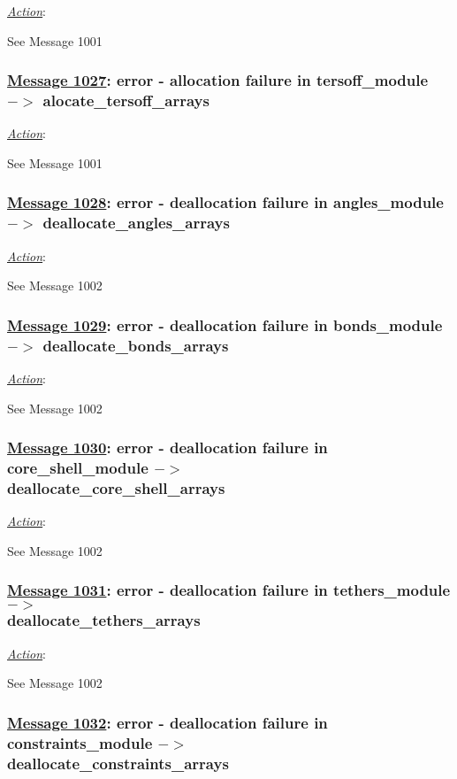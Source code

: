 \noindent \underline{\em Action}:

See Message 1001

\subsubsection*{\underline{Message 1027}: error - allocation failure in tersoff\_module $->$ alocate\_tersoff\_arrays}

\noindent \underline{\em Action}:

See Message 1001

\subsubsection*{\underline{Message 1028}: error - deallocation failure in angles\_module $->$ deallocate\_angles\_arrays}

\noindent \underline{\em Action}:

See Message 1002

\subsubsection*{\underline{Message 1029}: error - deallocation failure in bonds\_module $->$ deallocate\_bonds\_arrays}

\noindent \underline{\em Action}:

See Message 1002

\subsubsection*{\underline{Message 1030}: error - deallocation failure in core\_shell\_module $->$ \\
\noindent deallocate\_core\_shell\_arrays}

\noindent \underline{\em Action}:

See Message 1002

\subsubsection*{\underline{Message 1031}: error - deallocation failure in tethers\_module $->$ \\
\noindent deallocate\_tethers\_arrays}

\noindent \underline{\em Action}:

See Message 1002

\subsubsection*{\underline{Message 1032}: error - deallocation failure in constraints\_module $->$ \\
\noindent deallocate\_constraints\_arrays}


